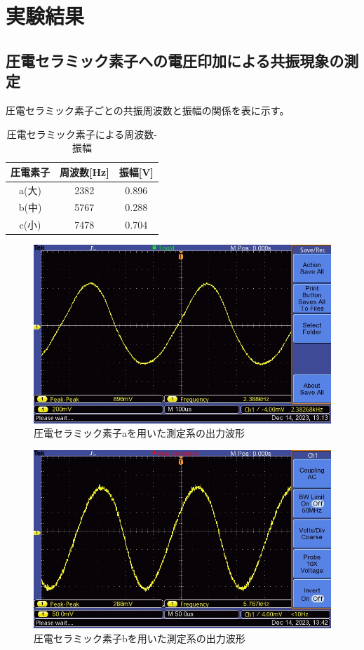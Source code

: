 \documentclass{ltjsarticle}
\begin{document}
\section{実験結果}
	\subsection{圧電セラミック素子への電圧印加による共振現象の測定}
		圧電セラミック素子ごとの共振周波数と振幅の関係を表に示す。
		\begin{table}[H]
		\begin{center}
		\caption{圧電セラミック素子による周波数-振幅}
		\label{tab:各圧電セラミック素子}
		\begin{tabular}{c|cc} \toprule
		圧電素子& 周波数[Hz]& 振幅[V] \\ \hline
		a(大) & 2382 & 0.896 \\
		b(中) & 5767 & 0.288 \\
		c(小) & 7478 & 0.704 \\ \bottomrule
		\end{tabular}
		\end{center}
		\end{table}
	
		\begin{figure}[H]
		\centering
		\includegraphics[width = 12cm]{figs/week4big.JPG}
		\caption{圧電セラミック素子aを用いた測定系の出力波形}
		\label{fig:圧電a}
		\end{figure}

		\begin{figure}[H]
		\centering
		\includegraphics[width = 12cm]{figs/week4mid.JPG}
		\caption{圧電セラミック素子bを用いた測定系の出力波形}
		\label{fig:圧電b}
		\end{figure}
\end{document}

